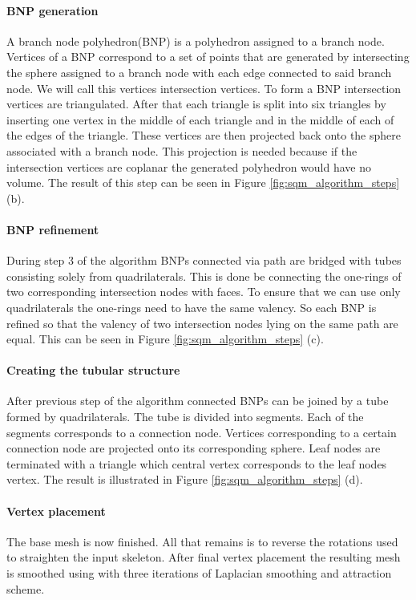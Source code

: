 \paragraph{BNP generation}
A branch node polyhedron(BNP) is a polyhedron assigned to a branch node. Vertices of a BNP correspond to a set of points that are generated by intersecting the sphere assigned to a branch node with each edge connected to said branch node. We will call this vertices intersection vertices. To form a BNP intersection vertices are triangulated. After that each triangle is split into six triangles by inserting one vertex in the middle of each triangle and in the middle of each of the edges of the triangle. These vertices are then projected back onto the sphere associated with a branch node. This projection is needed because if the intersection vertices are coplanar the generated polyhedron would have no volume. The result of this step can be seen in Figure \ref{fig:sqm_algorithm_steps} (b).

\paragraph{BNP refinement}
During step 3 of the algorithm BNPs connected via path are bridged with tubes consisting solely from quadrilaterals. This is done be connecting the one-rings of two corresponding intersection nodes with faces. To ensure that we can use only quadrilaterals the one-rings need to have the same valency. So each BNP is refined so that the valency of two intersection nodes lying on the same path are equal. This can be seen in Figure \ref{fig:sqm_algorithm_steps} (c).

\paragraph{Creating the tubular structure}
After previous step of the algorithm connected BNPs can be joined by a tube formed by quadrilaterals. The tube is divided into segments. Each of the segments corresponds to a connection node. Vertices corresponding to a certain connection node are projected onto its corresponding sphere. Leaf nodes are terminated with a triangle which central vertex corresponds to the leaf nodes vertex. The result is illustrated in Figure \ref{fig:sqm_algorithm_steps} (d).

\paragraph{Vertex placement}
The base mesh is now finished. All that remains is to reverse the rotations used to straighten the input skeleton. After final vertex placement the resulting mesh is smoothed using with three iterations of Laplacian smoothing and attraction scheme.

